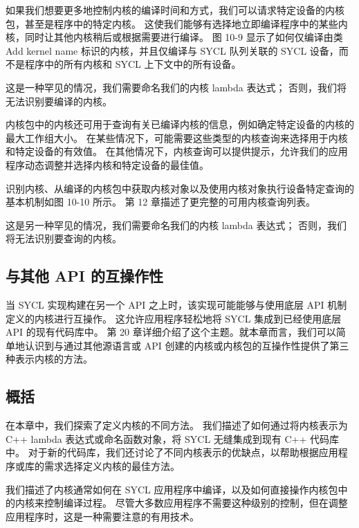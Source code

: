 如果我们想要更多地控制内核的编译时间和方式，我们可以请求特定设备的内核包，甚至是程序中的特定内核。 这使我们能够有选择地立即编译程序中的某些内核，同时让其他内核稍后或根据需要进行编译。 图 10-9 显示了如何仅编译由类 Add kernel name 标识的内核，并且仅编译与 SYCL 队列关联的 SYCL 设备，而不是程序中的所有内核和 SYCL 上下文中的所有设备。

这是一种罕见的情况，我们需要命名我们的内核 lambda 表达式； 否则，我们将无法识别要编译的内核。

内核包中的内核还可用于查询有关已编译内核的信息，例如确定特定设备的内核的最大工作组大小。 在某些情况下，可能需要这些类型的内核查询来选择用于内核和特定设备的有效值。 在其他情况下，内核查询可以提供提示，允许我们的应用程序动态调整并选择内核和特定设备的最佳值。

识别内核、从编译的内核包中获取内核对象以及使用内核对象执行设备特定查询的基本机制如图 10-10 所示。 第 12 章描述了更完整的可用内核查询列表。

这是另一种罕见的情况，我们需要命名我们的内核 lambda 表达式； 否则，我们将无法识别要查询的内核。

\subsection{与其他 API 的互操作性}
当 SYCL 实现构建在另一个 API 之上时，该实现可能能够与使用底层 API 机制定义的内核进行互操作。 这允许应用程序轻松地将 SYCL 集成到已经使用底层 API 的现有代码库中。 第 20 章详细介绍了这个主题。就本章而言，我们可以简单地认识到与通过其他源语言或 API 创建的内核或内核包的互操作性提供了第三种表示内核的方法。

\subsection{概括}
在本章中，我们探索了定义内核的不同方法。 我们描述了如何通过将内核表示为 C++ lambda 表达式或命名函数对象，将 SYCL 无缝集成到现有 C++ 代码库中。 对于新的代码库，我们还讨论了不同内核表示的优缺点，以帮助根据应用程序或库的需求选择定义内核的最佳方法。

我们描述了内核通常如何在 SYCL 应用程序中编译，以及如何直接操作内核包中的内核来控制编译过程。 尽管大多数应用程序不需要这种级别的控制，但在调整应用程序时，这是一种需要注意的有用技术。